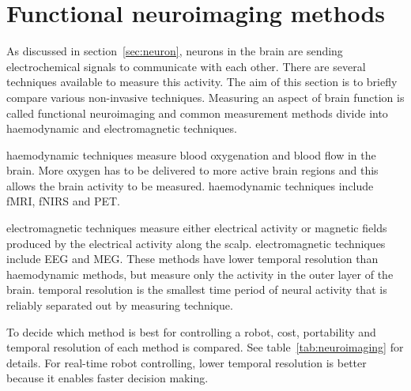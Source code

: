 \section{Functional neuroimaging methods}
\label{sec:neuroimaging}

As discussed in section~\ref{sec:neuron}, \glspl{neuron} in the brain are sending electrochemical signals to communicate with each other. There are several techniques available to measure this activity. The aim of this section is to briefly compare various non-invasive techniques. Measuring an aspect of brain function is called \gls{functional neuroimaging} and common measurement methods divide into \gls{haemodynamic} and \gls{electromagnetic} techniques.

\Gls{haemodynamic} techniques measure blood oxygenation and blood flow in the brain. More oxygen has to be delivered to more active brain regions and this allows the brain activity to be measured. \Gls{haemodynamic} techniques include \gls{fMRI}, \gls{fNIRS} and \gls{PET}.

\Gls{electromagnetic} techniques measure either electrical activity or magnetic fields produced by the electrical activity along the scalp. \Gls{electromagnetic} techniques include \gls{EEG} and \gls{MEG}. These methods have lower \gls{temporal resolution} than \gls{haemodynamic} methods, but measure only the activity in the outer layer of the brain. \Gls{temporal resolution} is the smallest time period of neural activity that is reliably separated out by measuring technique.

To decide which method is best for controlling a robot, cost, portability and \gls{temporal resolution} of each method is compared. See table~\ref{tab:neuroimaging} for details. For real-time robot controlling, lower \gls{temporal resolution} is better because it enables faster decision making.


\newcommand{\pMEG}{\tablefootnote{http://neurogadget.com/2012/12/15/inexpensive-magnetoencephalography-meg-system-could-be-available-at-every-hospital/6495}}
\newcommand{\pfMRI}{\tablefootnote{http://info.blockimaging.com/bid/92623/MRI-Machine-Cost-and-Price-Guide}}
\newcommand{\pPET}{\tablefootnote{http://info.blockimaging.com/bid/68875/How-Much-Does-a-PET-CT-Scanner-Cost}}
\newcommand{\pEEG}{\tablefootnote{http://en.wikipedia.org/wiki/Comparison\_of\_consumer\_brain-computer\_interfaces}}
\newcommand{\pNIRS}{\cite{NIRS}}
\newcommand{\tresol}{\cite{timeresol}}

